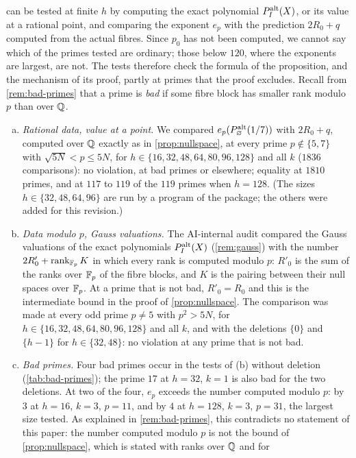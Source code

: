  can be tested at finite $h$ by computing the exact polynomial
$P^{\mathrm{alt}}_I(X)$, or its value at a rational point, and comparing the exponent $e_p$ with the
prediction $2R_0+q$ computed from the actual fibres. Since $p_0$ has not been computed, we cannot
say which of the primes tested are ordinary; those below $120$, where the exponents are largest,
are not. The tests therefore check the formula of the proposition, and the mechanism of its proof,
partly at primes that the proof excludes. Recall from
\cref{rem:bad-primes} that a prime is \emph{bad} if some fibre block has smaller rank modulo $p$
than over $\mathbb{Q}$.
\begin{enumerate}[(a)]
  \item \emph{Rational data, value at a point.} We compared $e_p(P^{\mathrm{alt}}_\varnothing(1/7))$ with
  $2R_0+q$, computed over $\mathbb{Q}$ exactly as in \cref{prop:nullspace}, at every prime
  $p\notin\{5,7\}$ with $\sqrt{5N}<p\le5N$, for $h\in\{16,32,48,64,80,96,128\}$ and all $k$
  ($1836$ comparisons): no violation, at bad primes or elsewhere; equality at $1810$ primes, and
  at $117$ to $119$ of the $119$ primes when $h=128$. (The sizes $h\in\{32,48,64,96\}$ are run by
  a program of the package; the others were added for this revision.)
  \item \emph{Data modulo $p$, Gauss valuations.} The AI-internal audit compared the Gauss
  valuations of the exact polynomials $P^{\mathrm{alt}}_I(X)$ (\cref{rem:gauss}) with the number
  $2R'_0+\operatorname{rank}_{\mathbb{F}_p}K$ in which every rank is computed modulo $p$: $R'_0$ is the sum of the ranks
  over $\mathbb{F}_p$ of the fibre blocks, and $K$ is the pairing between their null spaces over $\mathbb{F}_p$.
  At a prime that is not bad, $R'_0=R_0$ and this is the intermediate bound in the proof of
  \cref{prop:nullspace}. The comparison was made at every odd prime $p\ne5$ with $p^2>5N$, for
  $h\in\{16,32,48,64,80,96,128\}$ and all $k$, and with the deletions $\{0\}$ and $\{h-1\}$ for
  $h\in\{32,48\}$: no violation at any prime that is not bad.
  \item \emph{Bad primes.} Four bad primes occur in the tests of (b) without deletion
  (\cref{tab:bad-primes}); the prime $17$ at $h=32$, $k=1$ is also bad for the two deletions. At
  two of the four, $e_p$ exceeds the number computed modulo $p$: by $3$ at $h=16$, $k=3$, $p=11$,
  and by $4$ at $h=128$, $k=3$, $p=31$, the largest size tested. As explained in
  \cref{rem:bad-primes}, this contradicts no statement of this paper: the number computed modulo
  $p$ is not the bound of \cref{prop:nullspace}, which is stated with ranks over $\mathbb{Q}$ and for

\end{enumerate}
